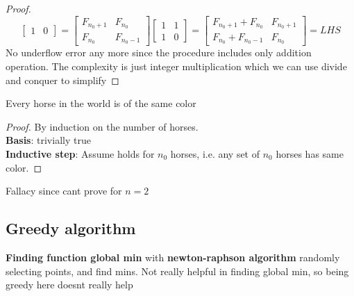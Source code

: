\documentclass[11pt]{article}
\begin{document}
\begin{example}
\begin{solution}
\begin{enumerate}
\begin{proof}
\[\begin{bmatrix}
          1 & 0
        \end{bmatrix} = \begin{bmatrix}
          F_{n_0+1} & F_{n_0} \\
          F_{n_0} & F_{n_0-1}
        \end{bmatrix} \begin{bmatrix}
          1 & 1 \\
          1 & 0
        \end{bmatrix} = \begin{bmatrix}
        F_{n_0 + 1} + F_{n_0} & F_{n_0 + 1}\\
        F_{n_0} + F_{n_0 - 1} & F_{n_0}
      \end{bmatrix} = LHS
      \]
      No underflow error any more since the procedure includes only addition operation. The complexity is just integer multiplication which we can use divide and conquer to simplify
    \end{proof}
  \end{enumerate}
\end{solution}


\end{example}



\begin{example}
  Every horse in the world is of the same color
  \begin{proof}
    By induction on the number of horses.\\
    \textbf{Basis}: trivially true \\
    \textbf{Inductive step}: Assume holds for $n_0$ horses, i.e. any set of $n_0$ horses has same color.
  \end{proof}
  Fallacy since cant prove for $n=2$
\end{example}

\subsection*{Greedy algorithm}

\begin{example}
  \textbf{Finding function global min} with
  \textbf{newton-raphson algorithm}
  randomly selecting points, and find mins. Not really helpful in finding global min, so being greedy here doesnt really help
\end{example}
\end{document}
